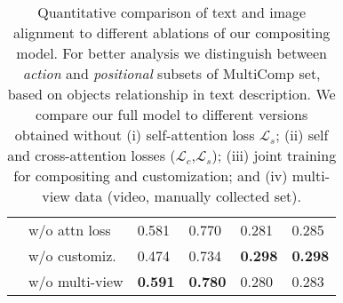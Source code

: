 \begin{table}[t!]
\begin{adjustbox}{width=0.47\textwidth}
\begin{tabular}{lllll}
\ \ w/o attn loss       &    0.581                                                                                                  &  0.770             &   0.281   &                    0.285                     \\
\ \ w/o customiz.       &    0.474                                                                                                 &  0.734              &   \textbf{0.298}   &                    \textbf{0.298}                     \\
\ \ w/o multi-view       &    \textbf{0.591}                                                                                                  &  \textbf{0.780}              &   0.280   &                    0.283                     \\




\bottomrule
\end{tabular}
\end{adjustbox}

\caption{Quantitative comparison of text and image alignment to different ablations of our compositing model. For better analysis we distinguish between \textit{action} and \textit{positional} subsets of MultiComp set, based on objects relationship in text description. We compare our full model to different versions obtained without (i) self-attention loss $\mathcal{L}_s$; (ii) self and cross-attention losses ($\mathcal{L}_c$,$\mathcal{L}_s$); (iii) joint training for compositing and customization; and (iv) multi-view data (\ie video, manually collected set).}
\label{tab:ablations}
\vspace{-6mm}
\end{table}

